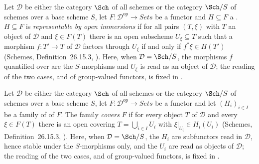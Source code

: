 \begin{definition}
\label{def:pc-open-subfunctor}
Let $\mathcal D$ be either the category $\Sch$ of all schemes or the
category $\Sch/S$ of schemes over a base scheme $S$, let
$F:\mathcal D^{\mathrm{op}}\to\textit{Sets}$ be a functor and
$H\subseteq F$ a .  $H\subseteq
F$ is \emph{representable by open immersions} if for all pairs
$(T,\xi)$ with $T$ an object of $\mathcal D$ and $\xi\in F(T)$ there is
an open subscheme $U_\xi\subseteq T$ such that a morphism $f:T'\to T$ of
$\mathcal D$ factors through $U_\xi$ if and only if $f^*\xi\in H(T')$
(Schemes, Definition~26.15.3,
).
Here, when $\mathcal D=\Sch/S$, the morphisms $f$ quantified over are the
$S$-morphisms and $U_\xi$ is read as an object of $\mathcal D$; the reading of
the two cases, and of group-valued functors, is fixed in
.
\end{definition}

\begin{definition}\label{def:pc-cover}
Let $\mathcal D$ be either the category $\Sch$ of all schemes or the
category $\Sch/S$ of schemes over a base scheme $S$, let
$F:\mathcal D^{\mathrm{op}}\to\textit{Sets}$ be a functor and
let $(H_i)_{i\in I}$ be a family of
 of $F$.  The family
\emph{covers} $F$ if for every object $T$ of $\mathcal D$ and every
$\xi\in F(T)$ there is an open covering $T=\bigcup_{i\in I}U_i$ with
$\xi|_{U_i}\in H_i(U_i)$ (Schemes, Definition~26.15.3,
).
Here, when $\mathcal D=\Sch/S$, the $H_i$ are subfunctors read in
$\mathcal D$, hence stable under the $S$-morphisms only, and the $U_i$ are
read as objects of $\mathcal D$; the reading of the two cases, and of
group-valued functors, is fixed in .
\end{definition}

